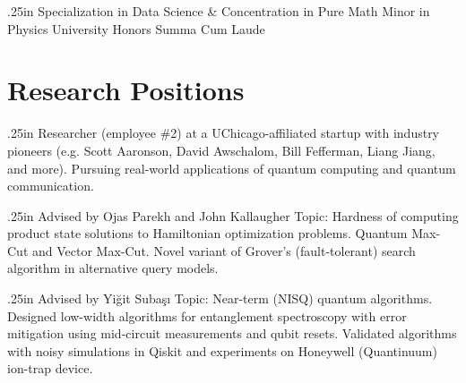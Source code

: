 \documentclass[11pt,letterpaper,serif]{moderncv}
\begin{document}
{}{}

\smallskip

\vspace{-\parsep}
{
	\begin{adjustwidth}{.25in}{}
		Specialization in Data Science \&
		Concentration in Pure Math \newline
		Minor in Physics \newline
		University Honors \newline
		Summa Cum Laude
	\end{adjustwidth}
}

%
\section{Research Positions}
{
	\begin{adjustwidth}{.25in}{}
		Researcher (employee \#2) at a UChicago-affiliated startup with industry pioneers (e.g. Scott Aaronson, David Awschalom, Bill Fefferman, Liang Jiang, and more).  \newline
		Pursuing real-world applications of quantum computing and quantum communication.
	\end{adjustwidth}
}


{
	\begin{adjustwidth}{.25in}{}
		Advised by Ojas Parekh and John Kallaugher \newline
		Topic: Hardness of computing product state solutions to Hamiltonian optimization problems. Quantum Max-Cut and Vector Max-Cut.
		Novel variant of Grover's (fault-tolerant) search algorithm in alternative query models.
	\end{adjustwidth}
}

{
	\begin{adjustwidth}{.25in}{}
		Advised by Yi\u{g}it Suba\c{s}\i \newline
		Topic: Near-term (NISQ) quantum algorithms.
		Designed low-width algorithms for entanglement spectroscopy with error mitigation using mid-circuit measurements and qubit resets.
		Validated algorithms with noisy simulations in Qiskit and experiments on Honeywell (Quantinuum) ion-trap device.
	\end{adjustwidth}
}
\end{document}
